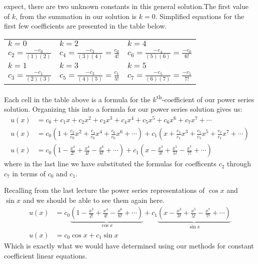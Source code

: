  expect, there are two unknown constants in this general solution.The first value of $k$, from the summation in our solution is $k=0$.  Simplified equations for the first few coefficients are presented in the table below.
\begin{table*}
\begin{tabular}{l | l | l}
$k=0$ & $k=2$ & $k=4$ \\
$c_2=\frac{-c_0}{(1)(2)}$ & $c_4=\frac{-c_2}{(3)(4)}=\frac{c_0}{4!}$ & $c_6 = \frac{-c_4}{(5)(6)} = \frac{-c_0}{6!}$ \\\hline
$k=1$ & $k=3$ & $k=5$ \\
$c_3 = \frac{-c_1}{(2)(3)}$ & $c_5 = \frac{-c_3}{(4)(5)}=\frac{c_1}{5!}$ & $c_7=\frac{-c_5}{(6)(7)} = \frac{-c_1}{7!}$\\
\end{tabular}
\end{table*}
Each cell in the table above is a formula for the $k$\textsuperscript{th}-coefficient of our power series solution.  Organizing this into a formula for our power series solution gives us:
\begin{align*}
u(x) &= c_0 + c_1x + c_2x^2+c_3x^3+c_4x^4+c_5x^5+c_6x^6+c_7x^7 + \cdots \\
u(x) &= c_0\left(1 + \frac{c_2}{c_0}x^2 + \frac{c_4}{c_0}x^4 + \frac{c_6}{c_0}x^6 + \cdots \right) + c_1\left(x + \frac{c_3}{c_1}x^3 + \frac{c_5}{c_1}x^5 + \frac{c_7}{c_1}x^7 + \cdots \right) \\
u(x)&=c_0\left(1-\frac{x^2}{2!}+\frac{x^4}{4!}-\frac{x^6}{6!} + \cdots  \right) + c_1\left(x -\frac{x^3}{3!}+\frac{x^5}{5!} - \frac{x^7}{7!} + \cdots \right)
\end{align*}
where in the last line we have substituted the formulas for coefficents $c_2$ through $c_7$ in terms of $c_0$ and $c_1$.

Recalling from the last lecture the power series representations of $\cos{x}$ and $\sin{x}$ and we should be able to see them again here.
\begin{align*}
u(x)&=c_0\underbrace{\left(1-\frac{x^2}{2!}+\frac{x^4}{4!}-\frac{x^6}{6!} + \cdots  \right)}_{\cos{x}} + c_1\underbrace{\left(x -\frac{x^3}{3!}+\frac{x^5}{5!} - \frac{x^7}{7!} + \cdots \right)}_{\sin{x}} \\
u(x)&=c_0\cos{x} + c_1\sin{x}
\end{align*}
Which is exactly what we would have determined using our methods for constant coefficient linear equations.

